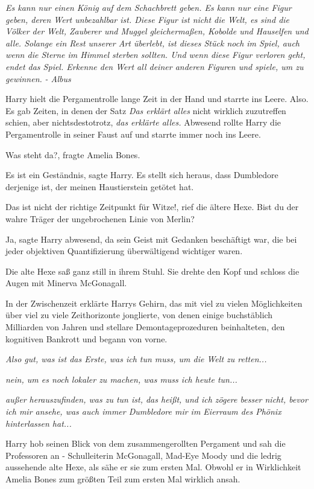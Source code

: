 \emph{Es kann nur einen König auf dem Schachbrett geben. Es kann nur eine Figur
geben, deren Wert unbezahlbar ist. Diese Figur ist nicht die Welt, es sind die
Völker der Welt, Zauberer und Muggel gleichermaßen, Kobolde und Hauselfen und
alle. Solange ein Rest unserer Art überlebt, ist dieses Stück noch im Spiel,
auch wenn die Sterne im Himmel sterben sollten. Und wenn diese Figur verloren
geht, endet das Spiel. Erkenne den Wert all deiner anderen Figuren und spiele,
um zu gewinnen.}
\emph{- Albus}

Harry hielt die Pergamentrolle lange Zeit in der Hand und starrte ins Leere.
Also. Es gab Zeiten, in denen der Satz \emph{\glqq{}Das erklärt alles\grqq{}}
nicht wirklich zuzutreffen schien, aber nichtsdestotrotz, \emph{das erklärte
alles.} Abwesend rollte Harry die Pergamentrolle in seiner Faust auf und starrte
immer noch ins Leere.

\glqq{}Was steht da?\grqq{}, fragte Amelia Bones.

\glqq{}Es ist ein Geständnis\grqq{}, sagte Harry. \glqq{}Es stellt sich heraus,
dass Dumbledore derjenige ist, der meinen Haustierstein getötet hat.\grqq{}

\glqq{}Das ist nicht der richtige Zeitpunkt für Witze!\grqq{}, rief die ältere
Hexe. \glqq{}Bist du der wahre Träger der ungebrochenen Linie von Merlin?\grqq{}

\glqq{}Ja\grqq{}, sagte Harry abwesend, da sein Geist mit Gedanken beschäftigt
war, die bei jeder objektiven Quantifizierung überwältigend wichtiger waren.

Die alte Hexe saß ganz still in ihrem Stuhl. Sie drehte den Kopf und schloss die
Augen mit Minerva McGonagall.

In der Zwischenzeit erklärte Harrys Gehirn, das mit viel zu vielen Möglichkeiten
über viel zu viele Zeithorizonte jonglierte, von denen einige buchstäblich
Milliarden von Jahren und stellare Demontageprozeduren beinhalteten, den
kognitiven Bankrott und begann von vorne.

\emph{Also gut, was ist das Erste, was ich tun muss, um die Welt zu retten...}

\emph{nein, um es noch lokaler zu machen, was muss ich heute tun...}

\emph{außer herauszufinden, was zu tun ist, das heißt, und ich zögere besser
nicht, bevor ich mir ansehe, was auch immer Dumbledore mir im Eierraum des
Phönix hinterlassen hat...}

Harry hob seinen Blick von dem zusammengerollten Pergament und sah die
Professoren an - Schulleiterin McGonagall, Mad-Eye Moody und die ledrig
aussehende alte Hexe, als sähe er sie zum ersten Mal. Obwohl er in Wirklichkeit
Amelia Bones zum größten Teil zum ersten Mal wirklich ansah.

